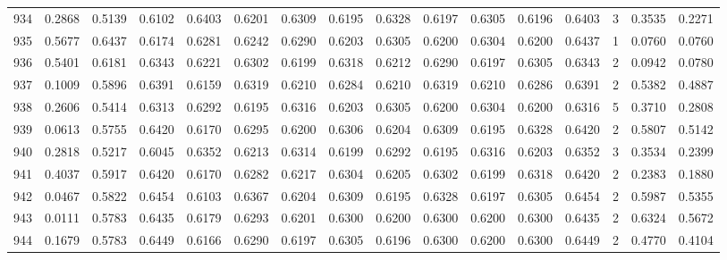 \begin{tabular}{lrrrrrrrrrrrrrrr}
934 &      0.2868 &  0.5139 &  0.6102 &  0.6403 &  0.6201 &  0.6309 &  0.6195 &  0.6328 &  0.6197 &  0.6305 &   0.6196 &     0.6403 &      3 &                    0.3535 &                     0.2271 \\
935 &      0.5677 &  0.6437 &  0.6174 &  0.6281 &  0.6242 &  0.6290 &  0.6203 &  0.6305 &  0.6200 &  0.6304 &   0.6200 &     0.6437 &      1 &                    0.0760 &                     0.0760 \\
936 &      0.5401 &  0.6181 &  0.6343 &  0.6221 &  0.6302 &  0.6199 &  0.6318 &  0.6212 &  0.6290 &  0.6197 &   0.6305 &     0.6343 &      2 &                    0.0942 &                     0.0780 \\
937 &      0.1009 &  0.5896 &  0.6391 &  0.6159 &  0.6319 &  0.6210 &  0.6284 &  0.6210 &  0.6319 &  0.6210 &   0.6286 &     0.6391 &      2 &                    0.5382 &                     0.4887 \\
938 &      0.2606 &  0.5414 &  0.6313 &  0.6292 &  0.6195 &  0.6316 &  0.6203 &  0.6305 &  0.6200 &  0.6304 &   0.6200 &     0.6316 &      5 &                    0.3710 &                     0.2808 \\
939 &      0.0613 &  0.5755 &  0.6420 &  0.6170 &  0.6295 &  0.6200 &  0.6306 &  0.6204 &  0.6309 &  0.6195 &   0.6328 &     0.6420 &      2 &                    0.5807 &                     0.5142 \\
940 &      0.2818 &  0.5217 &  0.6045 &  0.6352 &  0.6213 &  0.6314 &  0.6199 &  0.6292 &  0.6195 &  0.6316 &   0.6203 &     0.6352 &      3 &                    0.3534 &                     0.2399 \\
941 &      0.4037 &  0.5917 &  0.6420 &  0.6170 &  0.6282 &  0.6217 &  0.6304 &  0.6205 &  0.6302 &  0.6199 &   0.6318 &     0.6420 &      2 &                    0.2383 &                     0.1880 \\
942 &      0.0467 &  0.5822 &  0.6454 &  0.6103 &  0.6367 &  0.6204 &  0.6309 &  0.6195 &  0.6328 &  0.6197 &   0.6305 &     0.6454 &      2 &                    0.5987 &                     0.5355 \\
943 &      0.0111 &  0.5783 &  0.6435 &  0.6179 &  0.6293 &  0.6201 &  0.6300 &  0.6200 &  0.6300 &  0.6200 &   0.6300 &     0.6435 &      2 &                    0.6324 &                     0.5672 \\
944 &      0.1679 &  0.5783 &  0.6449 &  0.6166 &  0.6290 &  0.6197 &  0.6305 &  0.6196 &  0.6300 &  0.6200 &   0.6300 &     0.6449 &      2 &                    0.4770 &                     0.4104 \\

\end{tabular}
